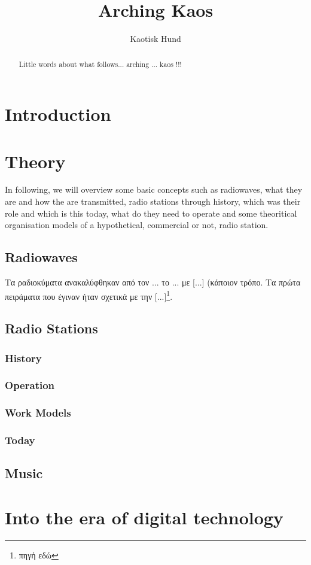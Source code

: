\documentclass[12pt]{report}
\title{Arching Kaos}
\author{Kaotisk Hund}
\begin{document}
\maketitle
\begin{abstract}
Little words about what follows... arching ... kaos !!!
\end{abstract}
\tableofcontents
{}
\chapter{Introduction}
\chapter{Theory}
In following, we will overview some basic concepts such as radiowaves, what they are and how the are transmitted, radio stations through history, which was their role and which is this today, what do they need to operate and some theoritical organisation models of a hypothetical, commercial or not, radio station.
\section{Radiowaves}
Τα ραδιοκύματα ανακαλύφθηκαν από τον ... το ... με [...] (κάποιον τρόπο. Τα πρώτα πειράματα που έγιναν ήταν σχετικά με την [...]\footnote{πηγή εδώ}.
\section{Radio Stations}
\subsection{History}
\subsection{Operation}
\subsection{Work Models}
\subsection{Today}
\section{Music}

\chapter{Into the era of digital technology}
\end{document}
